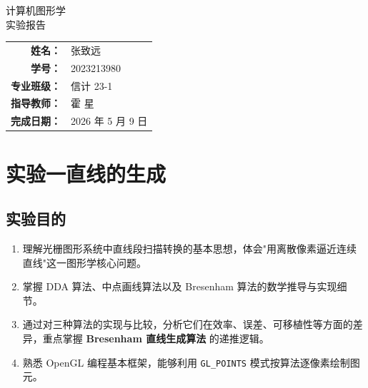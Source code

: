 \documentclass[a4paper,12pt]{ctexart}
\begin{document}
\thispagestyle{empty}
\begin{center}
    \vspace*{2cm}
    {\heiti 计算机图形学\\[0.4em]实验报告}\\[3cm]

    \renewcommand{\arraystretch}{1.8}
    {
    \begin{tabular}{r@{\quad}l}
        \textbf{姓\hspace{2em}名：} & 张致远 \\
        \textbf{学\hspace{2em}号：} & 2023213980 \\
        \textbf{专业班级：}         & 信计 23-1 \\
        \textbf{指导教师：}         & 霍\,\,星 \\
        \textbf{完成日期：}         & 2026 年 5 月 9 日 \\
    \end{tabular}}
    \vfill
\end{center}
\clearpage

\thispagestyle{plain}
\tableofcontents
\clearpage

\section{实验一\quad 直线的生成}

\subsection{实验目的}

\begin{enumerate}[leftmargin=2em,itemsep=0.2em]
    \item 理解光栅图形系统中直线段扫描转换的基本思想，体会"用离散像素逼近连续直线"这一图形学核心问题。
    \item 掌握 DDA 算法、中点画线算法以及 Bresenham 算法的数学推导与实现细节。
    \item 通过对三种算法的实现与比较，分析它们在效率、误差、可移植性等方面的差异，重点掌握 \textbf{Bresenham 直线生成算法} 的递推逻辑。
    \item 熟悉 OpenGL 编程基本框架，能够利用 \texttt{GL\_POINTS} 模式按算法逐像素绘制图元。
\end{enumerate}
\end{document}
